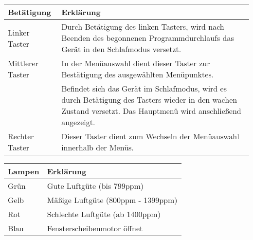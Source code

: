 \label{Handbuch}


\begin{table}[!hbt]
	\centering
	\begin{tabular}{|p{4cm}|p{12cm}|}
		
		\hline
		\rowcolor{lightgray} Betätigung & Erklärung \\
		\hline
		Linker Taster & Durch Betätigung des linken Tasters, wird nach Beenden des begonnenen Programmdurchlaufs das Gerät in den Schlafmodus versetzt. \\
		\hline
		Mittlerer Taster & In der Menüauswahl dient dieser Taster zur Bestätigung des ausgewählten Menüpunktes. \\
		& Befindet sich das Gerät im Schlafmodus, wird es durch Betätigung des Tasters wieder in den wachen Zustand versetzt. Das Hauptmenü wird anschließend angezeigt. \\
		\hline
		Rechter Taster & Dieser Taster dient zum Wechseln der Menüauswahl innerhalb der Menüs. \\
		\hline
		
	\end{tabular}
	\label{tab:Taster}
\end{table}

\begin{table}[!hbt]
	\centering
	
	\begin{tabular}{|p{4cm}|p{12cm}|}
		
		\hline
		\rowcolor{lightgray} Lampen & Erklärung \\
		\hline
		Grün & Gute Luftgüte (bis 799ppm) \\
		\hline
		Gelb & Mäßige Luftgüte (800ppm - 1399ppm) \\
		\hline
		Rot & Schlechte Luftgüte (ab 1400ppm) \\
		\hline
		Blau & Fensterscheibenmotor öffnet \\
		\hline
		
	\end{tabular}
	\label{tab:Lampen}
\end{table}

\newpage


